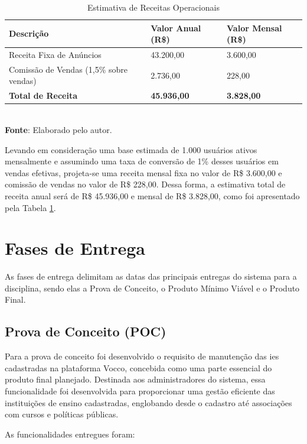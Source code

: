 \begin{table}[h!]
\centering
\caption{Estimativa de Receitas Operacionais}
\begin{tabular}{|m{6cm}|m{4cm}|m{4cm}|}
\hline
\textbf{Descrição} & \textbf{Valor Anual (R\$)} & \textbf{Valor Mensal (R\$)} \\
\hline
Receita Fixa de Anúncios & 43.200,00 & 3.600,00 \\
\hline
Comissão de Vendas (1,5\% sobre vendas) & 2.736,00 & 228,00 \\
\hline
\textbf{Total de Receita} & \textbf{45.936,00} & \textbf{3.828,00} \\
\hline
\end{tabular}
\label{table:estimativa-receitas}
\\[1ex]
\footnotesize \textbf{Fonte}: Elaborado pelo autor.
\end{table}

Levando em consideração uma base estimada de 1.000 usuários ativos mensalmente e assumindo uma taxa de conversão de 1\% desses usuários em vendas efetivas, projeta-se uma receita mensal fixa no valor de R\$ 3.600,00 e comissão de vendas no valor de R\$ 228,00. Dessa forma, a estimativa total de receita anual será de R\$ 45.936,00 e mensal de R\$ 3.828,00, como foi apresentado pela Tabela \ref{table:estimativa-receitas}.


\section{Fases de Entrega}

As fases de entrega delimitam as datas das principais entregas do sistema para a disciplina, sendo elas a Prova de Conceito, o Produto Mínimo Viável e o Produto Final.

\subsection{ Prova de Conceito (POC)}

Para a prova de conceito foi desenvolvido o requisito de manutenção das \ac{ies} cadastradas na plataforma Vocco, concebida como uma parte essencial do produto final planejado. Destinada aos administradores do sistema, essa funcionalidade foi desenvolvida para proporcionar uma gestão eficiente das instituições de ensino cadastradas, englobando desde o cadastro até associações com cursos e políticas públicas. 

As funcionalidades entregues foram:

